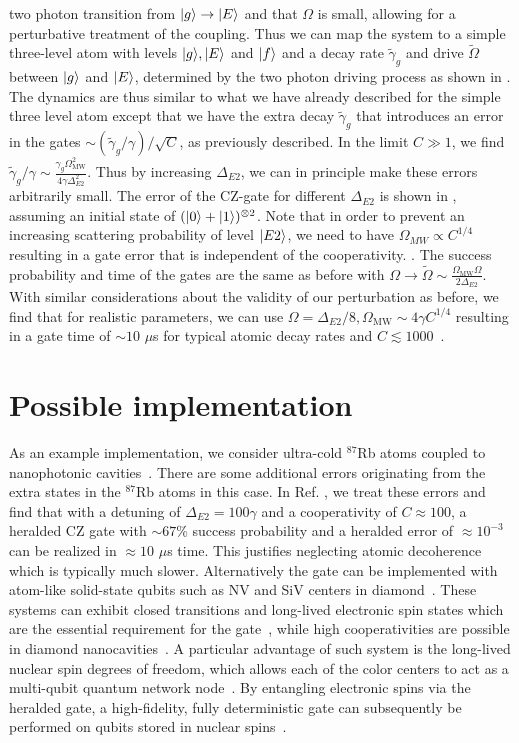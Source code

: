 two photon transition from $| g \rangle\to| E \rangle$ and that $\Omega$ is small,
allowing for a perturbative treatment of the coupling. Thus we can map
the system to a simple three-level atom with levels $| g \rangle,| E \rangle$ and
$| f \rangle$ and a decay rate $\tilde{\gamma}_{g}$ and drive $\tilde{\Omega}$
between $| g \rangle$ and $| E \rangle$, determined by the two photon driving process as
shown in . The dynamics are thus similar to what we have
already described for the simple three level atom except that we have the extra
decay $\tilde{\gamma}_{g}$ that introduces an error in the gates
$\sim(\tilde{\gamma}_{g}/\gamma)/\sqrt{C}$, as previously described. In the
limit $C\gg1$, we find
$\tilde{\gamma}_{g}/\gamma\sim\frac{\gamma_{g}\Omega_{\text{MW}}^{2}}{4\gamma\Delta_{E2}^{2}}$.
Thus by increasing $\Delta_{E2}$, we can in principle make these errors
arbitrarily small. The error of the CZ-gate for different $\Delta_{E2}$ is shown
in , assuming an initial state of
$(| 0 \rangle+| 1 \rangle)^{\otimes 2}$. Note that in order to prevent an increasing
scattering probability of level $| E2 \rangle$, we need to have $\Omega_{MW}\propto
C^{1/4}$ resulting in a gate error that is independent of the cooperativity.
\cite{SM}.
The success probability and time of the gates are the same as before with
$\Omega\to\tilde{\Omega}\sim\frac{\Omega_{\text{MW}}\Omega}{2\Delta_{E2}}$. With
similar considerations about the validity of our perturbation as
before, we find that for realistic parameters, we can use $\Omega=\Delta_{E2}/8,
\Omega_{\text{MW}}\sim4\gamma C^{1/4}$ resulting in a gate time of $\sim10$ $\mu$s for typical atomic decay rates and $C\lesssim1000$~\cite{SM}.   

\section{Possible implementation}

As an example implementation, we consider ultra-cold ${}^{87}$Rb atoms coupled
to nanophotonic cavities~\cite{thompson,Tiecke}. There are some additional
errors originating from the extra states in the ${}^{87}$Rb atoms in this case.
In Ref. \cite{SM}, we treat these errors and find that with a detuning of
$\Delta_{E2}=100\gamma$ and a cooperativity of $C\approx100$, a heralded CZ gate
with $\sim67\%$ success probability and a heralded error of $\approx 10^{-3}$
can be realized in $\approx10$ $\mu$s time. This justifies neglecting atomic
decoherence which is typically much slower.
Alternatively the gate can be implemented with atom-like solid-state qubits such
as NV and SiV centers in diamond~\cite{phystoday}. These systems can exhibit
closed transitions and long-lived electronic spin states which are the essential
requirement for the gate~\cite{togan}, while high cooperativities are possible
in  diamond nanocavities~\cite{burek}. A particular advantage of such system is
the long-lived nuclear spin degrees of freedom, which allows each of the color
centers  to act as a multi-qubit quantum network node~\cite{maurer}.   By
entangling electronic spins via the heralded gate, a high-fidelity, fully
deterministic gate can subsequently be performed on qubits stored in nuclear
spins~\cite{Anders2prl}.

